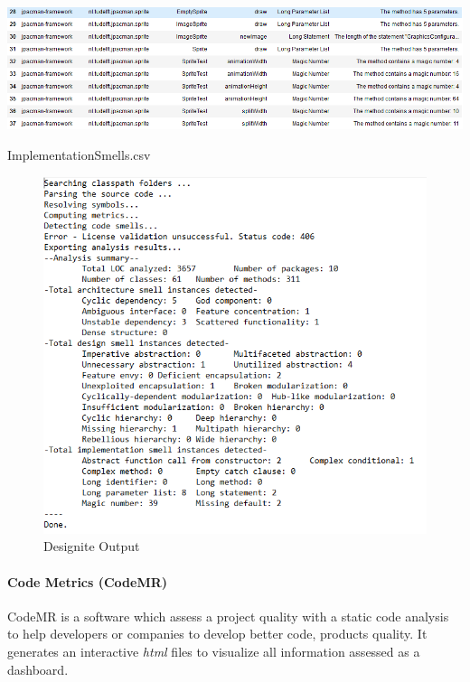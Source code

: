 \documentclass[]{article}
\begin{document}
\begin{table}[h]
    \includegraphics[scale=0.5]{imgs/badSmellsSample.PNG}
    \caption{ImplementationSmells.csv}
    \label{tab:BadSmells}
\end{table}

\begin{figure}
    \centering
    \includegraphics[scale=0.6]{imgs/DesigniteOutput.PNG}
    \caption{Designite Output}
    \label{fig:DesigniteOutput}
\end{figure}

\paragraph{Code Metrics (CodeMR)}

CodeMR is a software which assess a project quality with a static code analysis to help developers or companies to develop better code, products quality. It generates an interactive \textit{html} files to visualize all information assessed as a dashboard.\\
\end{document}
